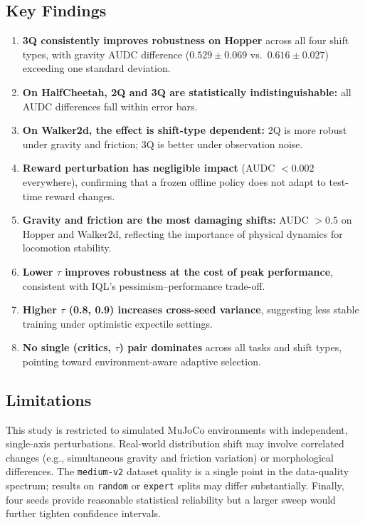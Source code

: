\documentclass[conference]{IEEEtran}
\begin{document}
\subsection{Key Findings}

\begin{enumerate}
  \item \textbf{3Q consistently improves robustness on Hopper} across all
        four shift types, with gravity AUDC difference ($0.529\pm0.069$
        vs.\ $0.616\pm0.027$) exceeding one standard deviation.
  \item \textbf{On HalfCheetah, 2Q and 3Q are statistically
        indistinguishable:} all AUDC differences fall within error bars.
  \item \textbf{On Walker2d, the effect is shift-type dependent:} 2Q is
        more robust under gravity and friction; 3Q is better under
        observation noise.
  \item \textbf{Reward perturbation has negligible impact}
        (AUDC $<0.002$ everywhere), confirming that a frozen offline policy
        does not adapt to test-time reward changes.
  \item \textbf{Gravity and friction are the most damaging shifts:}
        AUDC $>0.5$ on Hopper and Walker2d, reflecting the importance of
        physical dynamics for locomotion stability.
        \pagebreak
  \item \textbf{Lower $\tau$ improves robustness at the cost of peak
        performance}, consistent with IQL's pessimism--performance
        trade-off.
  \item \textbf{Higher $\tau$ (0.8, 0.9) increases cross-seed variance},
        suggesting less stable training under optimistic expectile settings.
  \item \textbf{No single (critics, $\tau$) pair dominates} across all
        tasks and shift types, pointing toward environment-aware adaptive
        selection.
\end{enumerate}

\subsection{Limitations}

This study is restricted to simulated MuJoCo environments with independent,
single-axis perturbations. Real-world distribution shift may involve correlated
changes (e.g., simultaneous gravity and friction variation) or morphological
differences. The \texttt{medium-v2} dataset quality is a single point in the
data-quality spectrum; results on \texttt{random} or \texttt{expert} splits
may differ substantially. Finally, four seeds provide reasonable statistical
reliability but a larger sweep would further tighten confidence intervals.
\end{document}
